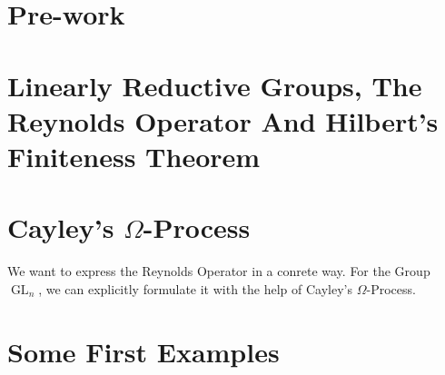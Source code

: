 \documentclass{article}
\theoremstyle{prrt}
\begin{document}
\section{Pre-work}\label{pw}

\bigskip



\section{Linearly Reductive Groups, The Reynolds Operator And Hilbert's Finiteness Theorem}



\section{Cayley's $\Omega$-Process}

We want to express the Reynolds Operator in a conrete way.
For the Group $\operatorname{GL}_n$, we can explicitly formulate it with the help of Cayley's $\Omega$-Process.



\section{Some First Examples}



% 
%
% 


\end{document}
